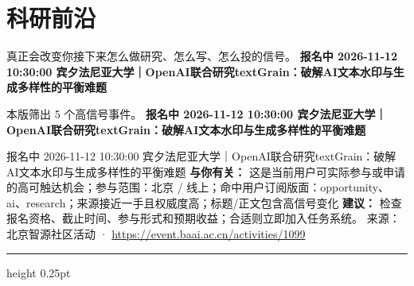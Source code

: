 \documentclass[10.5pt]{ctexart}
\begin{document}
\section*{科研前沿}
{\color{ormuted} 真正会改变你接下来怎么做研究、怎么写、怎么投的信号。}
\vspace{2mm}
{\LARGE\bfseries 报名中 2026-11-12 10:30:00 宾夕法尼亚大学｜OpenAI联合研究textGrain：破解AI文本水印与生成多样性的平衡难题}\par
\vspace{1mm}
{\color{ormuted} 本版筛出 5 个高信号事件。}
\vspace{3mm}
{\Large\bfseries 报名中 2026-11-12 10:30:00 宾夕法尼亚大学｜OpenAI联合研究textGrain：破解AI文本水印与生成多样性的平衡难题}\par
报名中 2026-11-12 10:30:00 宾夕法尼亚大学｜OpenAI联合研究textGrain：破解AI文本水印与生成多样性的平衡难题
\textbf{与你有关：} 这是当前用户可实际参与或申请的高可触达机会；参与范围：北京 / 线上；命中用户订阅版面：opportunity、ai、research；来源接近一手且权威度高；标题/正文包含高信号变化
\textbf{建议：} 检查报名资格、截止时间、参与形式和预期收益；合适则立即加入任务系统。
{\footnotesize\color{ormuted} 来源：北京智源社区活动 · \url{https://event.baai.ac.cn/activities/1099}}
\vspace{4mm}
\hrule height 0.25pt
\vspace{3mm}
\end{document}
